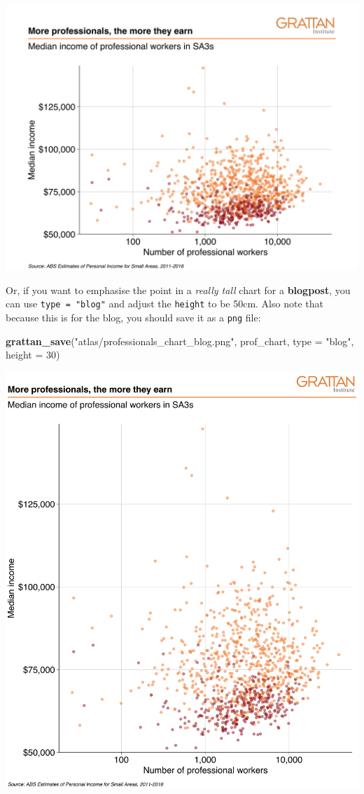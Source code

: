\documentclass[
]{book}
\newenvironment{Shaded}{\begin{snugshade}}{\end{snugshade}}
\newcommand{\DataTypeTok}[1]{\textcolor[rgb]{0.13,0.29,0.53}{#1}}
\newcommand{\DecValTok}[1]{\textcolor[rgb]{0.00,0.00,0.81}{#1}}
\newcommand{\KeywordTok}[1]{\textcolor[rgb]{0.13,0.29,0.53}{\textbf{#1}}}
\newcommand{\NormalTok}[1]{#1}
\newcommand{\StringTok}[1]{\textcolor[rgb]{0.31,0.60,0.02}{#1}}
\begin{document}
\includegraphics[width=44.44in]{atlas/professionals_chart_presentation}

Or, if you want to emphasise the point in a \emph{really tall} chart for a \textbf{blogpost}, you can use \texttt{type\ =\ "blog"} and adjust the \texttt{height} to be 50cm. Also note that because this is for the blog, you should save it as a \texttt{png} file:

\begin{Shaded}
\begin{Highlighting}[]
\KeywordTok{grattan\_save}\NormalTok{(}\StringTok{"atlas/professionals\_chart\_blog.png"}\NormalTok{, prof\_chart, }
             \DataTypeTok{type =} \StringTok{"blog"}\NormalTok{, }\DataTypeTok{height =} \DecValTok{30}\NormalTok{)}
\end{Highlighting}
\end{Shaded}

\includegraphics[width=44.44in]{atlas/professionals_chart_blog}
\end{document}

